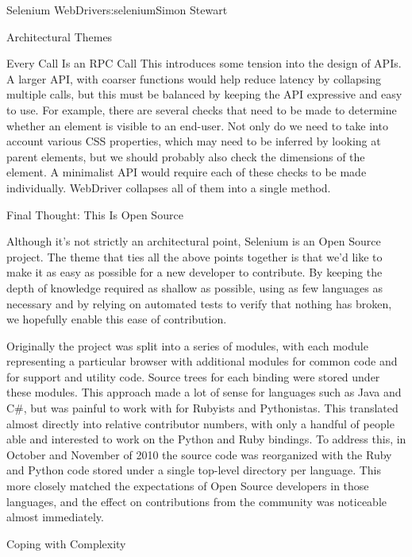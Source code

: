 \begin{aosachapter}{Selenium WebDriver}{s:selenium}{Simon Stewart}
\begin{aosasect1}{Architectural Themes}
\begin{aosasect2}{Every Call Is an RPC Call}
This introduces some tension into the design of APIs. A larger API,
with coarser functions would help reduce latency by collapsing
multiple calls, but this must be balanced by keeping the API
expressive and easy to use. For example, there are several checks that
need to be made to determine whether an element is visible to an
end-user. Not only do we need to take into account various CSS
properties, which may need to be inferred by looking at parent
elements, but we should probably also check the dimensions of the
element. A minimalist API would require each of these checks to be
made individually. WebDriver collapses all of them into a single
 method.

\end{aosasect2}

\begin{aosasect2}{Final Thought: This Is Open Source}

Although it's not strictly an architectural point, Selenium is an Open
Source project. The theme that ties all the above points together is
that we'd like to make it as easy as possible for a new developer to
contribute. By keeping the depth of knowledge required as shallow as
possible, using as few languages as necessary and by relying on
automated tests to verify that nothing has broken, we hopefully enable
this ease of contribution.

Originally the project was split into a series of modules, with each
module representing a particular browser with additional modules for
common code and for support and utility code. Source trees for each
binding were stored under these modules. This approach made a lot of
sense for languages such as Java and C\#, but was painful to work with
for Rubyists and Pythonistas. This translated almost directly into
relative contributor numbers, with only a handful of people able and
interested to work on the Python and Ruby bindings. To address this,
in October and November of 2010 the source code was reorganized with
the Ruby and Python code stored under a single top-level directory per
language. This more closely matched the expectations of Open Source
developers in those languages, and the effect on contributions from
the community was noticeable almost immediately.

\end{aosasect2}

\end{aosasect1}

\begin{aosasect1}{Coping with Complexity}


\end{aosasect1}
\end{aosachapter}
